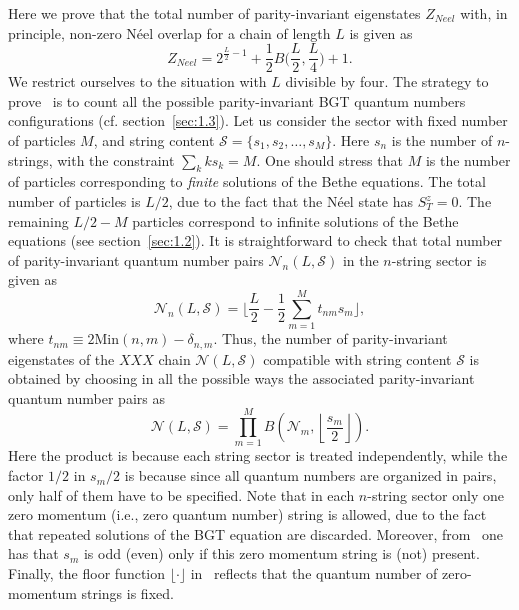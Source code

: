\documentclass[11pt]{iopart}
\begin{document}
Here we prove that the total number of parity-invariant eigenstates $Z_{Neel}$ 
with, in principle, non-zero N\'eel overlap for a chain of length $L$ is given 
as 
%
\begin{equation}
\label{N-count}
Z_{Neel}=2^{\frac{L}{2}-1}+\frac{1}{2}B\Big(\frac{L}{2},\frac{L}{4}\Big)+1. 
\end{equation}
%
We restrict ourselves to the situation with $L$ divisible by four. The strategy to 
prove~ is to count all the possible parity-invariant BGT quantum numbers 
configurations (cf. section~\ref{sec:1.3}). Let us consider the sector with fixed number 
of particles $M$, and string content ${\mathcal S}=\{s_1,s_2,\dots,s_{M}\}$. Here $s_n$ is 
the number of $n$-strings, with the constraint $\sum_k ks_k=M$. One should stress that 
$M$ is the number of particles corresponding to {\it finite} solutions of the Bethe 
equations. The total number of particles is $L/2$, due to the fact that the N\'eel 
state has $S_T^z=0$. The remaining $L/2-M$ particles correspond to infinite solutions 
of the Bethe equations (see section~\ref{sec:1.2}). It is straightforward to check that 
total number of parity-invariant quantum number pairs ${\mathcal N}_n(L,{\mathcal S})$ 
in the $n$-string sector is given as 
%
\begin{equation}
\label{NnLS}
{\mathcal N}_n(L,{\mathcal S})=\Big\lfloor\frac{L}{2}-\frac{1}{2}
\sum_{m=1}^{M}t_{nm}s_m\Big\rfloor,
\end{equation}
%
where $t_{nm}\equiv 2\textrm{Min}(n,m)-\delta_{n,m}$. Thus, the number of parity-invariant 
eigenstates of the $XXX$ chain ${\mathcal N}(L,{\mathcal S})$ compatible with string content 
${\mathcal S}$ is obtained by choosing in all the possible ways the associated parity-invariant 
quantum number pairs as     
%
\begin{equation}
\label{NLS}
{\mathcal N}(L,{\mathcal S})=\prod_{m=1}^{M} B\left({\mathcal N}_m,\left\lfloor
\frac{s_m}{2}\right\rfloor\right).
\end{equation}
%
Here the product is because each string sector is treated independently, while the 
factor $1/2$ in $s_m/2$ is because since all quantum numbers are organized in pairs, 
only half of them have to be specified. Note that in each $n$-string sector only one 
zero momentum (i.e., zero quantum number) string is allowed, due to the fact that 
repeated solutions of the BGT equation are discarded. Moreover, from~ one has 
that $s_m$ is odd (even) only if this zero momentum string is (not) present. Finally, 
the floor function $\lfloor\cdot\rfloor$ in~ reflects that the quantum number 
of zero-momentum strings is fixed. 
\end{document}
